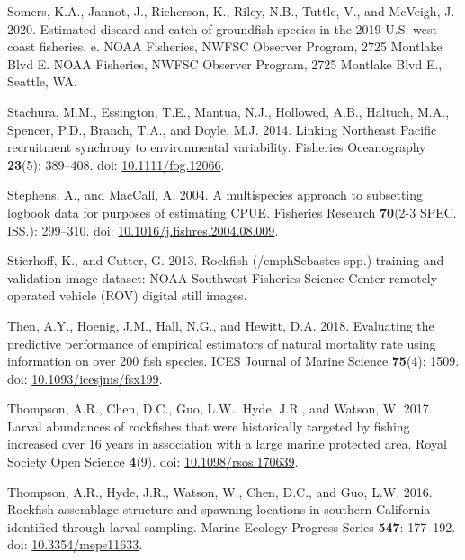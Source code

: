 \documentclass[11pt,
  english,
]{article}
\newlength{\cslhangindent}
\newenvironment{CSLReferences}[2] %
 {%
  \setlength{\parindent}{0pt}
  \ifodd #1 \everypar{\setlength{\hangindent}{\cslhangindent}}\ignorespaces\fi
  \ifnum #2 > 0
  \setlength{\parskip}{#2\baselineskip}
  \fi
 }%
 {}
\begin{document}
\begin{CSLReferences}{1}{0}
\leavevmode{}%
Somers, K.A., Jannot, J., Richerson, K., Riley, N.B., Tuttle, V., and McVeigh, J. 2020. {Estimated discard and catch of groundfish species in the 2019 U.S. west coast fisheries. e}. NOAA Fisheries, NWFSC Observer Program, 2725 Montlake Blvd E. NOAA Fisheries, NWFSC Observer Program, 2725 Montlake Blvd E., Seattle, WA.

\leavevmode{}%
Stachura, M.M., Essington, T.E., Mantua, N.J., Hollowed, A.B., Haltuch, M.A., Spencer, P.D., Branch, T.A., and Doyle, M.J. 2014. {Linking Northeast Pacific recruitment synchrony to environmental variability}. Fisheries Oceanography \textbf{23}(5): 389--408. doi: \href{https://doi.org/10.1111/fog.12066}{10.1111/fog.12066}.

\leavevmode{}%
Stephens, A., and MacCall, A. 2004. {A multispecies approach to subsetting logbook data for purposes of estimating CPUE}. Fisheries Research \textbf{70}(2-3 SPEC. ISS.): 299--310. doi: \href{https://doi.org/10.1016/j.fishres.2004.08.009}{10.1016/j.fishres.2004.08.009}.

\leavevmode{}%
Stierhoff, K., and Cutter, G. 2013. {Rockfish (/emph{Sebastes spp.}) training and validation image dataset: NOAA Southwest Fisheries Science Center remotely operated vehicle (ROV) digital still images.}

\leavevmode{}%
Then, A.Y., Hoenig, J.M., Hall, N.G., and Hewitt, D.A. 2018. {Evaluating the predictive performance of empirical estimators of natural mortality rate using information on over 200 fish species}. ICES Journal of Marine Science \textbf{75}(4): 1509. doi: \href{https://doi.org/10.1093/icesjms/fsx199}{10.1093/icesjms/fsx199}.

\leavevmode{}%
Thompson, A.R., Chen, D.C., Guo, L.W., Hyde, J.R., and Watson, W. 2017. {Larval abundances of rockfishes that were historically targeted by fishing increased over 16 years in association with a large marine protected area}. Royal Society Open Science \textbf{4}(9). doi: \href{https://doi.org/10.1098/rsos.170639}{10.1098/rsos.170639}.

\leavevmode{}%
Thompson, A.R., Hyde, J.R., Watson, W., Chen, D.C., and Guo, L.W. 2016. {Rockfish assemblage structure and spawning locations in southern California identified through larval sampling}. Marine Ecology Progress Series \textbf{547}: 177--192. doi: \href{https://doi.org/10.3354/meps11633}{10.3354/meps11633}.


\end{CSLReferences}
\end{document}

